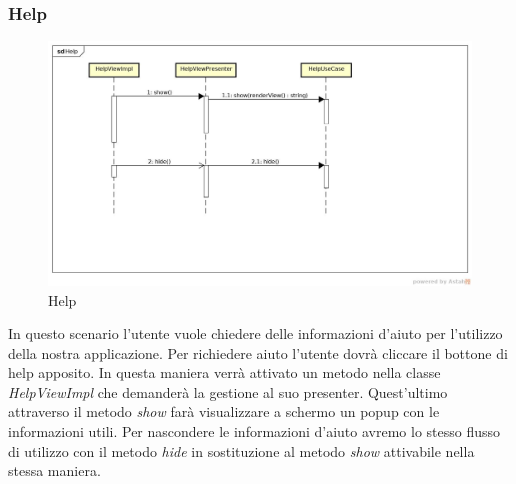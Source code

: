 \subsubsection{Help}

\label{Help}
\begin{figure}[H]
	\centering
	\includegraphics[width=\textwidth]{Sezioni/Diagrammi/App/Help.jpg}
	\caption{Help}
	
\end{figure}

In questo scenario l'utente vuole chiedere delle informazioni d'aiuto per l'utilizzo della nostra applicazione. Per richiedere aiuto l'utente dovrà cliccare il bottone di help apposito. In questa maniera verrà attivato un metodo nella classe \textit{HelpViewImpl} che demanderà la gestione al suo presenter. Quest'ultimo attraverso il metodo \textit{show} farà visualizzare a schermo un popup con le informazioni utili. Per nascondere le informazioni d'aiuto avremo lo stesso flusso di utilizzo con il metodo \textit{hide} in sostituzione al metodo \textit{show} attivabile nella stessa maniera.

